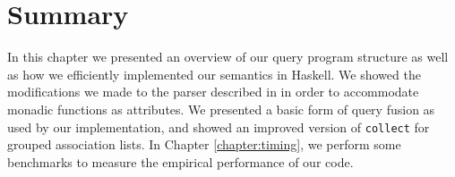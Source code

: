 \documentclass[../main.tex]{subfiles}
\begin{document}


\section{Summary}

In this chapter we presented an overview of our query program structure as well as how we efficiently implemented our semantics in Haskell.
We showed the modifications we made to the parser described in \cite{frosthafiz2008} in order to accommodate monadic functions as attributes.
We presented a basic form of query fusion as used by our implementation, and showed an improved version of \texttt{collect} for
grouped association lists.  In Chapter \ref{chapter:timing}, we perform some benchmarks to measure the empirical performance of our code.
\end{document}
